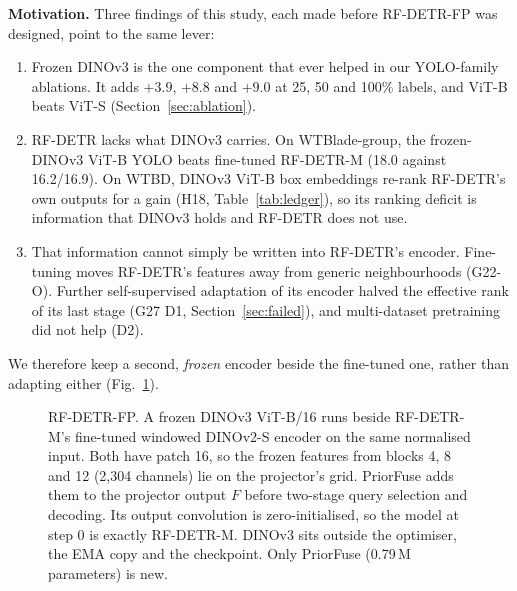 \textbf{Motivation.} Three findings of this study, each made before RF-DETR-FP was designed, point to the same lever:
\begin{enumerate}
\item Frozen DINOv3 is the one component that ever helped in our YOLO-family ablations. It adds $+3.9$, $+8.8$ and $+9.0$ \mcoco at 25, 50 and 100\% labels, and ViT-B beats ViT-S (Section~\ref{sec:ablation}).
\item RF-DETR lacks what DINOv3 carries. On WTBlade-group, the frozen-DINOv3 ViT-B YOLO beats fine-tuned RF-DETR-M (18.0 against 16.2/16.9). On WTBD, DINOv3 ViT-B box embeddings re-rank RF-DETR's own outputs for a gain (H18, Table~\ref{tab:ledger}), so its ranking deficit is information that DINOv3 holds and RF-DETR does not use.
\item That information cannot simply be written into RF-DETR's encoder. Fine-tuning moves RF-DETR's features away from generic neighbourhoods (G22-O). Further self-supervised adaptation of its encoder halved the effective rank of its last stage (G27 D1, Section~\ref{sec:failed}), and multi-dataset pretraining did not help (D2).
\end{enumerate}
We therefore keep a second, \emph{frozen} encoder beside the fine-tuned one, rather than adapting either (Fig.~\ref{fig:arch-fp}).

\begin{figure}[!t]
\centering
\resizebox{\textwidth}{!}{}
\caption{RF-DETR-FP. A frozen DINOv3 ViT-B/16 runs beside RF-DETR-M's fine-tuned windowed DINOv2-S encoder on the same normalised input. Both have patch 16, so the frozen features from blocks 4, 8 and 12 (2{,}304 channels) lie on the projector's grid. PriorFuse adds them to the projector output $F$ before two-stage query selection and decoding. Its output convolution is zero-initialised, so the model at step 0 is exactly RF-DETR-M. DINOv3 sits outside the optimiser, the EMA copy and the checkpoint. Only PriorFuse (0.79\,M parameters) is new.}
\label{fig:arch-fp}
\end{figure}

